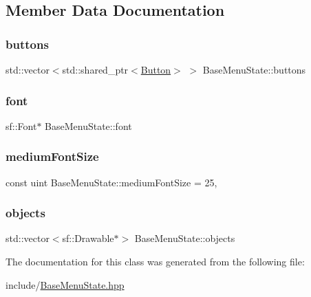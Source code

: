 \subsection{Member Data Documentation}
\mbox{\label{class_base_menu_state_ab63cc442453d06b70372d627ceaf8a8e}} 
\subsubsection{\texorpdfstring{buttons}{buttons}}
{\footnotesize\ttfamily std\+::vector$<$std\+::shared\+\_\+ptr$<$\mbox{\hyperlink{class_button}{Button}}$>$ $>$ Base\+Menu\+State\+::buttons\hspace{0.3cm}{\ttfamily [protected]}}

\mbox{\label{class_base_menu_state_a2759c3ca4cfd0f34175846e295e0f4e9}} 
\subsubsection{\texorpdfstring{font}{font}}
{\footnotesize\ttfamily sf\+::\+Font$\ast$ Base\+Menu\+State\+::font\hspace{0.3cm}{\ttfamily [protected]}}

\mbox{\label{class_base_menu_state_a003cf33aa9c69fa85db7486f6812b4f6}} 
\subsubsection{\texorpdfstring{mediumFontSize}{mediumFontSize}}
{\footnotesize\ttfamily const uint Base\+Menu\+State\+::medium\+Font\+Size = 25\hspace{0.3cm}{\ttfamily [static]}, {\ttfamily [protected]}}

\mbox{\label{class_base_menu_state_a59278b3c16e953a01ad350b179024778}} 
\subsubsection{\texorpdfstring{objects}{objects}}
{\footnotesize\ttfamily std\+::vector$<$sf\+::\+Drawable$\ast$$>$ Base\+Menu\+State\+::objects\hspace{0.3cm}{\ttfamily [protected]}}



The documentation for this class was generated from the following file\+:\begin{DoxyCompactItemize}
\item 
include/\mbox{\hyperlink{_base_menu_state_8hpp}{Base\+Menu\+State.\+hpp}}\end{DoxyCompactItemize}
